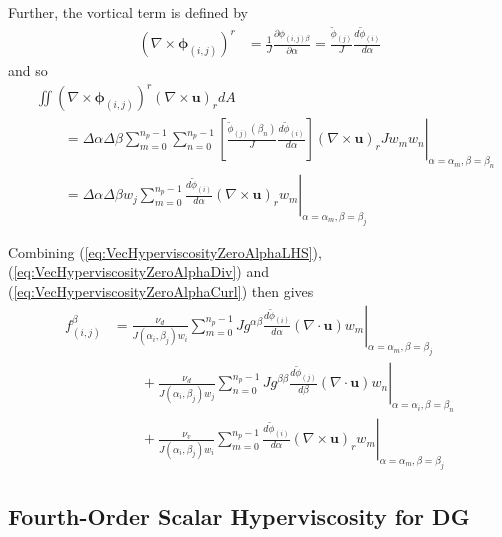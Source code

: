\documentclass{article}
\newcommand{\vb}{\mathbf}
\newcommand{\vg}{\boldsymbol}
\newcommand{\diff}[2]{\frac{d #1}{d #2}}
\newcommand{\pdiff}[2]{\frac{\partial #1}{\partial #2}}
\begin{document}
Further, the vortical term is defined by
\begin{align}
(\nabla \times \vg{\phi}_{(i,j)})^r &= \frac{1}{J} \pdiff{\phi_{(i,j) \beta}}{\alpha} = \frac{\tilde{\phi}_{(j)}}{J} \diff{\tilde{\phi}_{(i)}}{\alpha}
\end{align} and so
\begin{align}
& \iint (\nabla \times \vg{\phi}_{(i,j)})^r (\nabla \times \vb{u})_r dA \nonumber \\
& \qquad = \Delta \alpha \Delta \beta \sum_{m=0}^{n_p-1} \sum_{n=0}^{n_p-1} \left. \left[\frac{\tilde{\phi}_{(j)}(\beta_n)}{J} \diff{\tilde{\phi}_{(i)}}{\alpha}\right] (\nabla \times \vb{u})_r J w_m w_n \right\vert_{\alpha = \alpha_m, \beta = \beta_n} \\
& \qquad = \Delta \alpha \Delta \beta w_j \sum_{m=0}^{n_p-1} \left. \diff{\tilde{\phi}_{(i)}}{\alpha} (\nabla \times \vb{u})_r w_m \right\vert_{\alpha = \alpha_m, \beta = \beta_j} \label{eq:VecHyperviscosityZeroAlphaCurl}
\end{align}

Combining (\ref{eq:VecHyperviscosityZeroAlphaLHS}), (\ref{eq:VecHyperviscosityZeroAlphaDiv}) and (\ref{eq:VecHyperviscosityZeroAlphaCurl}) then gives
\begin{align}
f^{\beta}_{(i,j)} &= \frac{\nu_d}{J(\alpha_i, \beta_j) w_i} \sum_{m=0}^{n_p-1} \left. J g^{\alpha \beta} \diff{\tilde{\phi}_{(i)}}{\alpha} (\nabla \cdot \vb{u}) w_m \right\vert_{\alpha = \alpha_m, \beta = \beta_j} \nonumber \\
& \qquad + \frac{\nu_d}{J(\alpha_i, \beta_j) w_j} \sum_{n=0}^{n_p-1} \left. J g^{\beta \beta} \diff{\tilde{\phi}_{(j)}}{\beta} (\nabla \cdot \vb{u}) w_n \right\vert_{\alpha = \alpha_i, \beta = \beta_n} \nonumber \\
& \qquad + \frac{\nu_v}{J(\alpha_i, \beta_j) w_i} \sum_{m=0}^{n_p-1} \left. \diff{\tilde{\phi}_{(i)}}{\alpha} (\nabla \times \vb{u})_r w_m \right\vert_{\alpha = \alpha_m, \beta = \beta_j}
\end{align}

\subsection{Fourth-Order Scalar Hyperviscosity for DG}
\end{document}
